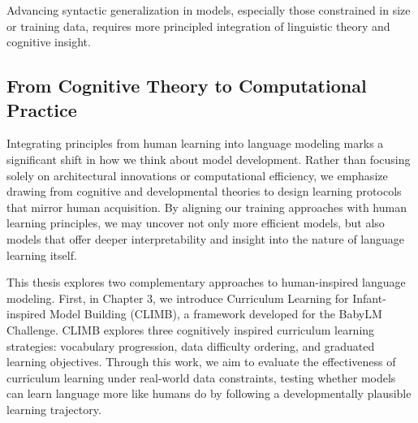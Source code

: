 

\vspace{1em}

 Advancing syntactic generalization in models, especially those constrained in size or training data, requires more principled integration of linguistic theory and cognitive insight.

\subsection*{From Cognitive Theory to Computational Practice}

Integrating principles from human learning into language modeling marks a significant shift in how we think about model development. Rather than focusing solely on architectural innovations or computational efficiency, we emphasize drawing from cognitive and developmental theories to design learning protocols that mirror human acquisition. By aligning our training approaches with human learning principles, we may uncover not only more efficient models, but also models that offer deeper interpretability and insight into the nature of language learning itself.

This thesis explores two complementary approaches to human-inspired language modeling. First, in Chapter 3, we introduce Curriculum Learning for Infant-inspired Model Building (CLIMB), a framework developed for the BabyLM Challenge. CLIMB explores three cognitively inspired curriculum learning strategies: vocabulary progression, data difficulty ordering, and graduated learning objectives. Through this work, we aim to evaluate the effectiveness of curriculum learning under real-world data constraints, testing whether models can learn language more like humans do by following a developmentally plausible learning trajectory.

